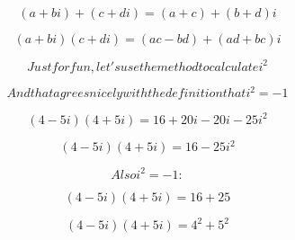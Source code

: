 \[(a+bi) + (c+di) = (a+c) + (b+d)i\]

\[(a+bi)(c+di) = (ac-bd) + (ad+bc)i\]

\[Just for fun, let's use the method to calculate i^{2}\]

\[And that agrees nicely with the definition that i^{2 }= -1\]

\[(4 - 5i)(4 + 5i) = 16 + 20i - 20i - 25i^{2}\]

\[(4 - 5i)(4 + 5i) = 16 - 25i^{2}\]

\[Also i^{2} = -1 :\]

\[(4 - 5i)(4 + 5i) = 16 + 25\]

\[(4 - 5i)(4 + 5i) = 4^{2} + 5^{2}\]
